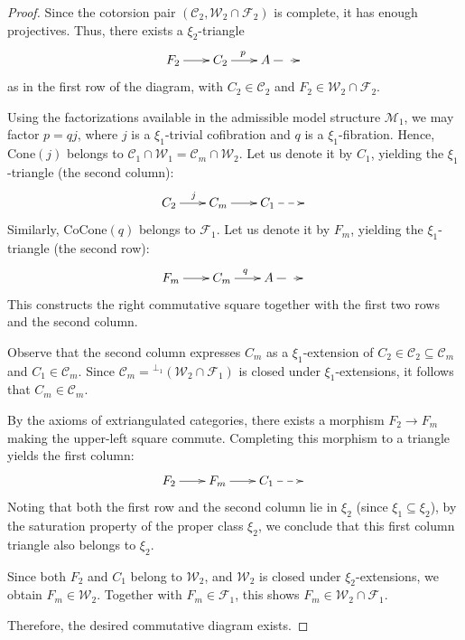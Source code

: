 \documentclass[11pt,a4paper]{amsart}
\numberwithin{equation}{section}
\theoremstyle{plain}
\begin{document}
\begin{proof}
	Since the cotorsion pair $(\mathcal{C}_2,\mathcal{W}_2\cap\mathcal{F}_2)$ is complete, it has enough projectives. Thus, there exists a $\xi_{2}$-triangle
	\[ \xymatrix@C=2em{F_2 \ar[r] & C_2 \ar[r]^{p} & A \ar@{-->}[r] & } \]
	as in the first row of the diagram, with $C_2\in\mathcal{C}_2$ and $F_2\in\mathcal{W}_2\cap\mathcal{F}_2$.
	
	Using the factorizations available in the admissible model structure $\mathcal{M}_1$, we may factor $p=qj$, where $j$ is a $\xi_1$-trivial cofibration and $q$ is a $\xi_1$-fibration. Hence, $\mathrm{Cone}(j)$ belongs to $\mathcal{C}_1\cap\mathcal{W}_1 = \mathcal{C}_m\cap\mathcal{W}_2$. Let us denote it by $C_1$, yielding the $\xi_1$-triangle (the second column):
	\[ \xymatrix@C=2em{C_2 \ar[r]^{j} & C_m \ar[r] & C_1 \ar@{-->}[r] & } \]
	Similarly, $\mathrm{CoCone}(q)$ belongs to $\mathcal{F}_1$. Let us denote it by $F_m$, yielding the $\xi_1$-triangle (the second row):
	\[ \xymatrix@C=2em{F_m \ar[r] & C_m \ar[r]^{q} & A \ar@{-->}[r] & } \]
	This constructs the right commutative square together with the first two rows and the second column.
	
	Observe that the second column expresses $C_m$ as a $\xi_1$-extension of $C_2\in\mathcal{C}_2\subseteq\mathcal{C}_m$ and $C_1\in\mathcal{C}_m$. Since $\mathcal{C}_m={}^{\perp_1}(\mathcal{W}_2\cap\mathcal{F}_1)$ is closed under $\xi_1$-extensions, it follows that $C_m\in\mathcal{C}_m$.
	
	By the axioms of extriangulated categories, there exists a morphism $F_2\to F_m$ making the upper-left square commute. Completing this morphism to a triangle yields the first column:
	\[ \xymatrix@C=2em{F_2 \ar[r] & F_m \ar[r] & C_1 \ar@{-->}[r] & } \]
	Noting that both the first row and the second column lie in $\xi_2$ (since $\xi_1 \subseteq \xi_2$), by the saturation property of the proper class $\xi_2$, we conclude that this first column triangle also belongs to $\xi_2$.
	
	Since both $F_2$ and $C_1$ belong to $\mathcal{W}_2$, and $\mathcal{W}_2$ is closed under $\xi_2$-extensions, we obtain $F_m\in\mathcal{W}_2$. Together with $F_m\in\mathcal{F}_1$, this shows $F_m\in\mathcal{W}_2\cap\mathcal{F}_1$.
	
	Therefore, the desired commutative diagram exists.
\end{proof}
\end{document}
